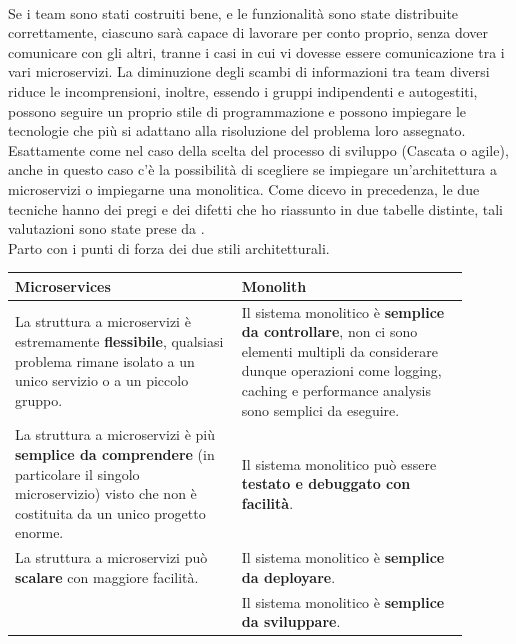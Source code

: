 \\
Se i team sono stati costruiti bene, e le funzionalità sono state distribuite correttamente, ciascuno sarà capace di lavorare per conto proprio, senza dover comunicare con gli altri, tranne i casi in cui vi dovesse essere comunicazione tra i vari microservizi. La diminuzione degli scambi di informazioni tra team diversi riduce le incomprensioni, inoltre, essendo i gruppi indipendenti e autogestiti, possono seguire un proprio stile di programmazione e possono impiegare le tecnologie che più si adattano alla risoluzione del problema loro assegnato.
\\
Esattamente come nel caso della scelta del processo di sviluppo (Cascata o agile), anche in questo caso c'è la possibilità di scegliere se impiegare un'architettura a microservizi o impiegarne una monolitica. Come dicevo in precedenza, le due tecniche hanno dei pregi e dei difetti che ho riassunto in due tabelle distinte, tali valutazioni sono state prese da \cite{ProsConsMicroservices}.
\\
Parto con i punti di forza dei due stili architetturali.

\begin{center}
    \begin{tabular}{|p{0.45\linewidth}|p{0.45\linewidth}|}
    \hline
    \textbf{Microservices} & \textbf{Monolith}\\
    \hline
    \rowcolor{LighterGreen}
     La struttura a microservizi è estremamente \textbf{flessibile}, qualsiasi problema rimane isolato a un unico servizio o a un piccolo gruppo. &  Il sistema monolitico è \textbf{semplice da controllare}, non ci sono elementi multipli da considerare dunque operazioni come logging, caching e performance analysis sono semplici da eseguire.\\
    \hline
    \rowcolor{Green}
     La struttura a microservizi è più \textbf{semplice da comprendere} (in particolare il singolo microservizio) visto che non è costituita da un unico progetto enorme. & Il sistema monolitico può essere \textbf{testato e debuggato con facilità}. \\
    \hline
    \rowcolor{LightGreen}
    La struttura a microservizi può \textbf{scalare} con maggiore facilità. & Il sistema monolitico è \textbf{semplice da deployare}. \\
    \hline
    \rowcolor{LighterGreen}
    & Il sistema monolitico è \textbf{semplice da sviluppare}. \\
    \hline
    \end{tabular}
\end{center}

